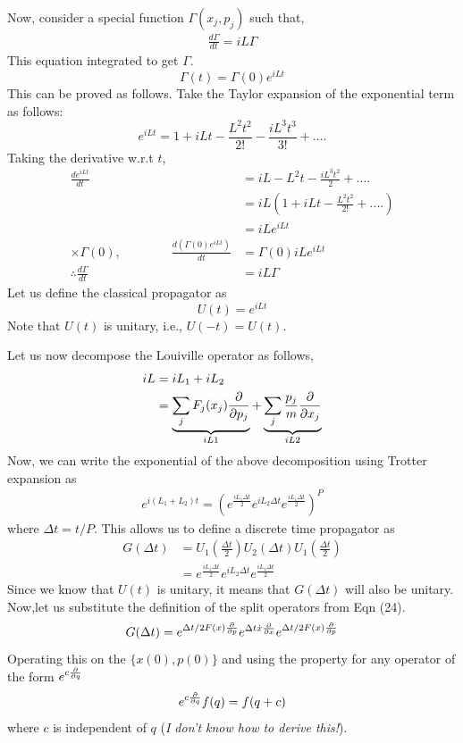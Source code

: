 \documentclass[11pt, oneside]{article}   	%
\begin{document}
Now, consider a special function $\Gamma(x_j, p_j)$ such that,
	\begin{align}
	\frac{d \Gamma}{dt} = iL \Gamma
	\end{align}
This equation integrated to get $\Gamma$.
	\begin{equation}
	\Gamma (t) = \Gamma (0) e^{iLt} 
	\end{equation}
This can be proved as follows. Take the Taylor expansion of the exponential term as follows:
	\begin{equation}
	e^{iLt} = 1 + iLt - \frac{L^2t^2}{2!} -\frac{iL^3 t^3}{3!} + ....
	\end{equation}
Taking the derivative w.r.t $t$,
	\begin{align}
	\frac{d e^{iLt}}{dt} &= iL - L^2t -\frac{iL^3 t^2}{2} + .... \\
				 &= iL \left( 1 + iLt - \frac{L^2t^2}{2!}+ .... \right) \\
				 &= iL e^{iLt}\\
	 \times \Gamma(0), \qquad \qquad  \frac{d (\Gamma(0)e^{iLt})}{dt} &= \Gamma(0) iL e^{iLt} \\
	\therefore \frac{d\Gamma}{dt} &= iL \Gamma
	\end{align}
Let us define the classical propagator as 
	\begin{equation}
	 U(t) = e^{iLt}
	\end{equation}
Note that $U(t)$ is unitary, i.e., $U(-t)  =U(t)$.

Let us now decompose the Louiville operator as follows,
	\begin{align}
	iL &= iL_1 + iL_2 \\
	   &= \underbrace{\sum \limits_j F_j(x_j) \pdv{}{p_j}}_{iL1} + \underbrace{\sum \limits_j\frac{p_j}{m}\pdv{}{x_j}}_{iL2}
	\end{align}
Now, we can write the exponential of the above decomposition using Trotter expansion as
	\begin{align}
	e^{i(L_1 + L_2)t} = (e^{\frac{iL_1 \Delta t}{2}} e^{iL_2 \Delta t} e^{\frac{iL_1 \Delta t}{2}})^P
	\end{align}
where $\Delta t = t/P$. This allows us to define a discrete time propagator as
	\begin{align}
	G(\Delta t) &= U_1(\frac{\Delta t}{2}) U_2(\Delta t) U_1(\frac{\Delta t}{2}) \\
	&= e^{\frac{iL_1 \Delta t}{2}} e^{iL_2 \Delta t} e^{\frac{iL_1 \Delta t}{2}}
	\end{align}
Since we know that $U(t)$ is unitary, it means that $G(\Delta t)$ will also be unitary. Now,let us substitute the definition of the split operators from Eqn (24).
	\begin{equation}
	G(\Delta t) = e^{\Delta t/2 F(x) \pdv{}{p}} e^{ \Delta t \dot{x} \pdv{}{x}} e^{\Delta t/2 F(x) \pdv{}{p}}
	\end{equation}
Operating this on the $\{x(0), p(0) \}$ and using the property for any operator of the form $e^{c \pdv{}{q}}$
	\begin{equation}
	e^{c \pdv{}{q}} f(q) = f(q+c)
	\end{equation}
where $c$ is independent of $q$ (\textit{I don't know how to derive this!}).
\end{document}

